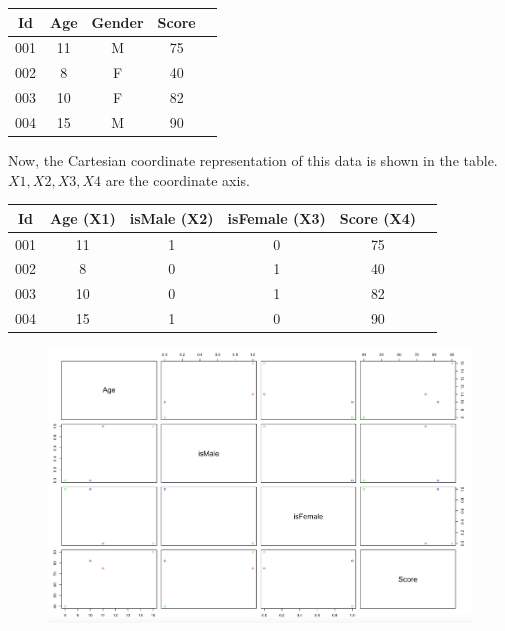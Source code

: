 \documentclass[12pt]{book}\usepackage{knitr}
\begin{document}
 \begin{center}
      \begin{tabular}{ |c|c|c|c|c| } 
        \hline
          \textbf{Id} & \textbf{Age} & \textbf{Gender} &  \textbf{Score} \\
        \hline   
          001 & 11 & M & 75\\
        \hline
          002 & 8 & F & 40\\
        \hline  
          003 & 10 & F & 82\\
        \hline
          004 & 15 & M  & 90\\
        \hline       
      \end{tabular}
    \end{center}

Now, the Cartesian coordinate representation of this data is shown in the table. $X1,X2,X3,X4$ are the coordinate axis.

 \begin{center}
      \begin{tabular}{ |c|c|c|c|c|c| } 
        \hline
          \textbf{Id} & \textbf{Age (X1)} & \textbf{isMale (X2)} &  \textbf{isFemale (X3)} & \textbf{Score (X4)} \\
        \hline   
          001 & 11 & 1 & 0 & 75\\
        \hline
          002 & 8 & 0 & 1 & 40\\
        \hline  
          003 & 10 & 0 & 1 & 82\\
        \hline
          004 & 15 & 1 & 0 & 90\\
        \hline       
      \end{tabular}
    \end{center}

\begin{figure}[ht]
 \centering
    \includegraphics[width = 15 cm]{./viz/ext/ScatterplotMatrix.jpeg}
\end{figure}
\end{document}
